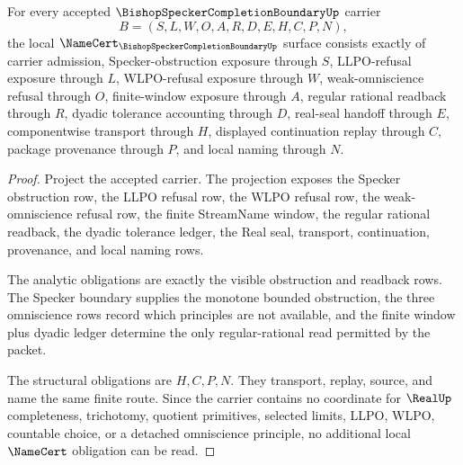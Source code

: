 \begin{theorem}
\label{thm:bishop-specker-completion-boundary-namecert-obligations}
For every accepted $\BishopSpeckerCompletionBoundaryUp$ carrier
$$
B=(S,L,W,O,A,R,D,E,H,C,P,N),
$$
the local $\NameCert_{\BishopSpeckerCompletionBoundaryUp}$ surface consists exactly of carrier admission, Specker-obstruction exposure through $S$, LLPO-refusal exposure through $L$, WLPO-refusal exposure through $W$, weak-omniscience refusal through $O$, finite-window exposure through $A$, regular rational readback through $R$, dyadic tolerance accounting through $D$, real-seal handoff through $E$, componentwise transport through $H$, displayed continuation replay through $C$, package provenance through $P$, and local naming through $N$.
\end{theorem}
\begin{proof}
Project the accepted carrier. The projection exposes the Specker obstruction row, the LLPO refusal row, the WLPO refusal row, the weak-omniscience refusal row, the finite StreamName window, the regular rational readback, the dyadic tolerance ledger, the Real seal, transport, continuation, provenance, and local naming rows.

The analytic obligations are exactly the visible obstruction and readback rows. The Specker boundary supplies the monotone bounded obstruction, the three omniscience rows record which principles are not available, and the finite window plus dyadic ledger determine the only regular-rational read permitted by the packet.

The structural obligations are $H,C,P,N$. They transport, replay, source, and name the same finite route. Since the carrier contains no coordinate for $\RealUp$ completeness, trichotomy, quotient primitives, selected limits, LLPO, WLPO, countable choice, or a detached omniscience principle, no additional local $\NameCert$ obligation can be read.
\end{proof}

